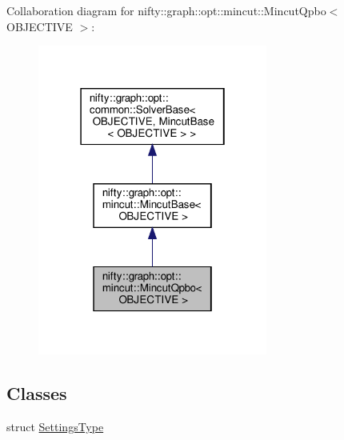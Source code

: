 Collaboration diagram for nifty\+:\+:graph\+:\+:opt\+:\+:mincut\+:\+:Mincut\+Qpbo$<$ O\+B\+J\+E\+C\+T\+I\+VE $>$\+:
\nopagebreak
\begin{figure}[H]
\begin{center}
\leavevmode
\includegraphics[width=214pt]{classnifty_1_1graph_1_1opt_1_1mincut_1_1MincutQpbo__coll__graph}
\end{center}
\end{figure}
\subsection*{Classes}
\begin{DoxyCompactItemize}
\item 
struct \hyperlink{structnifty_1_1graph_1_1opt_1_1mincut_1_1MincutQpbo_1_1SettingsType}{Settings\+Type}
\end{DoxyCompactItemize}

